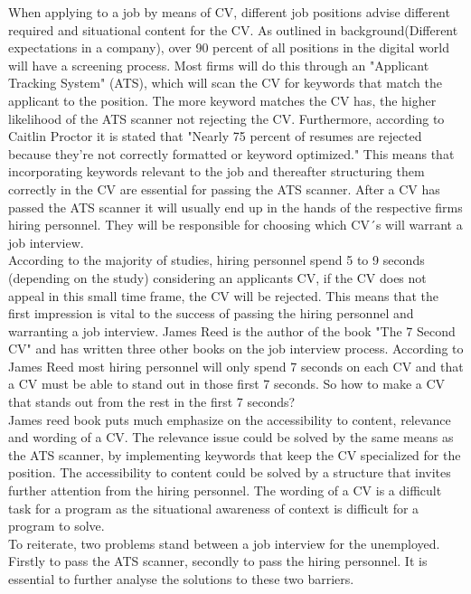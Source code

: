 When applying to a job by means of CV, different job positions advise different required and situational content for the CV.
As outlined in background(Different expectations in a company), over 90 percent of all positions in the digital world will have a screening process.
Most firms will do this through an "Applicant Tracking System" (ATS), which will scan the CV for keywords that match the applicant to the position.
The more keyword matches the CV has, the higher likelihood of the ATS scanner not rejecting the CV.
Furthermore, according to Caitlin Proctor it is stated that "Nearly 75 percent of resumes are rejected because they’re not correctly formatted or keyword optimized."
This means that incorporating keywords relevant to the job and thereafter structuring them correctly in the CV are essential for passing the ATS scanner.
After a CV has passed the ATS scanner it will usually end up in the hands of the respective firms hiring personnel. 
They will be responsible for choosing which CV´s will warrant a job interview. \\

According to the majority of studies, hiring personnel spend 5 to 9 seconds (depending on the study) considering an applicants CV, if the CV does not appeal in this small time frame, the CV will be rejected.
This means that the first impression is vital to the success of passing the hiring personnel and warranting a job interview.
James Reed is the author of the book "The 7 Second CV" and has written three other books on the job interview process.
According to James Reed most hiring personnel will only spend 7 seconds on each CV and that a CV must be able to stand out in those first 7 seconds.
So how to make a CV that stands out from the rest in the first 7 seconds? \\

James reed book puts much emphasize on the accessibility to content, relevance and wording of a CV. \cite{7_second_test}
The relevance issue could be solved by the same means as the ATS scanner, by implementing keywords that keep the CV specialized for the position.
The accessibility to content could be solved by a structure that invites further attention from the hiring personnel.
The wording of a CV is a difficult task for a program as the situational awareness of context is difficult for a program to solve.
\cite{7_Seconds_to_Get_a_Recruiter_Attention}
\cite{ATS-scanner}
\cite{7_second_test} \\

To reiterate, two problems stand between a job interview for the unemployed.
Firstly to pass the ATS scanner, secondly to pass the hiring personnel.
It is essential to further analyse the solutions to these two barriers. 

